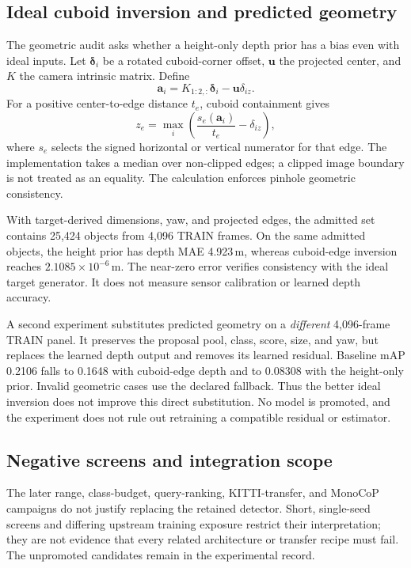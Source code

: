 \subsection{Ideal cuboid inversion and predicted geometry}
The geometric audit asks whether a height-only depth prior has a bias even with ideal inputs. Let $\boldsymbol\delta_i$ be a rotated cuboid-corner offset, $\mathbf u$ the projected center, and $K$ the camera intrinsic matrix. Define
\begin{equation}
 \mathbf a_i=K_{1:2,:}\boldsymbol\delta_i-\mathbf u\delta_{iz}.
\end{equation}
For a positive center-to-edge distance $t_e$, cuboid containment gives
\begin{equation}
 z_e=\max_i\left(\frac{s_e(\mathbf a_i)}{t_e}-\delta_{iz}\right),
\end{equation}
where $s_e$ selects the signed horizontal or vertical numerator for that edge. The implementation takes a median over non-clipped edges; a clipped image boundary is not treated as an equality. The calculation enforces pinhole geometric consistency. 

With target-derived dimensions, yaw, and projected edges, the admitted set contains 25,424 objects from 4,096 TRAIN frames. On the same admitted objects, the height prior has depth MAE 4.923\,m, whereas cuboid-edge inversion reaches $2.1085\times10^{-6}$\,m. The near-zero error verifies consistency with the ideal target generator. It does not measure sensor calibration or learned depth accuracy.

A second experiment substitutes predicted geometry on a \emph{different} 4,096-frame TRAIN panel. It preserves the proposal pool, class, score, size, and yaw, but replaces the learned depth output and removes its learned residual. Baseline mAP 0.2106 falls to 0.1648 with cuboid-edge depth and to 0.08308 with the height-only prior. Invalid geometric cases use the declared fallback. Thus the better ideal inversion does not improve this direct substitution. No model is promoted, and the experiment does not rule out retraining a compatible residual or estimator. 

\subsection{Negative screens and integration scope}
The later range, class-budget, query-ranking, KITTI-transfer, and MonoCoP campaigns do not justify replacing the retained detector. Short, single-seed screens and differing upstream training exposure restrict their interpretation; they are not evidence that every related architecture or transfer recipe must fail. The unpromoted candidates remain in the experimental record. 

